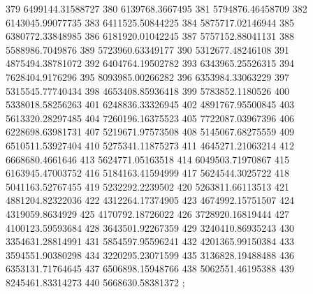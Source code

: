 {379 6499144.31588727
380 6139768.3667495
381 5794876.46458709
382 6143045.99077735
383 6411525.50844225
384 5875717.02146944
385 6380772.33848985
386 6181920.01042245
387 5757152.88041131
388 5588986.7049876
389 5723960.63349177
390 5312677.48246108
391 4875494.38781072
392 6404764.19502782
393 6343965.25526315
394 7628404.9176296
395 8093985.00266282
396 6353984.33063229
397 5315545.77740434
398 4653408.85936418
399 5783852.1180526
400 5338018.58256263
401 6248836.33326945
402 4891767.95500845
403 5613320.28297485
404 7260196.16375523
405 7722087.03967396
406 6228698.63981731
407 5219671.97573508
408 5145067.68275559
409 6510511.53927404
410 5275341.11875273
411 4645271.21063214
412 6668680.4661646
413 5624771.05163518
414 6049503.71970867
415 6163945.47003752
416 5184163.41594999
417 5624544.3025722
418 5041163.52767455
419 5232292.2239502
420 5263811.66113513
421 4881204.82322036
422 4312264.17374905
423 4674992.15751507
424 4319059.8634929
425 4170792.18726022
426 3728920.16819444
427 4100123.59593684
428 3643501.92267359
429 3240410.86935243
430 3354631.28814991
431 5854597.95596241
432 4201365.99150384
433 3594551.90380298
434 3220295.23071599
435 3136828.19488488
436 6353131.71764645
437 6506898.15948766
438 5062551.46195388
439 8245461.83314273
440 5668630.58381372
};
%
